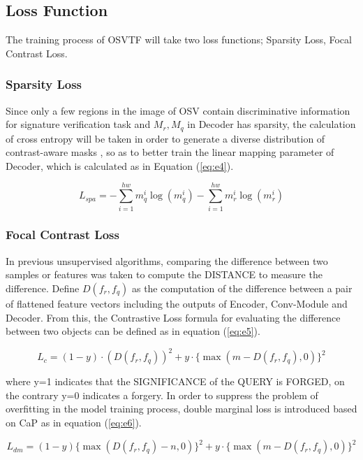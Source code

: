 \documentclass{article}
\begin{document}
\subsection{Loss Function}

The training process of OSVTF will take two loss functions; Sparsity Loss, Focal Contrast Loss.

\subsubsection*{Sparsity Loss}
Since only a few regions in the image of OSV contain discriminative information for signature verification task and $M_r,M_q$ in Decoder has sparsity, the calculation of cross entropy will be taken in order to generate a diverse distribution of contrast-aware masks \cite{16}, so as to better train the linear mapping parameter of Decoder, which is calculated as in Equation (\ref{eq:e4}).

\begin{equation}\label{eq:e4}
	L_{spa}=-\sum_{i=1}^{hw} m_q^i \log(m_q^i ) - \sum_{i=1}^{hw} m_r^i \log(m_r^i)
\end{equation}


\subsubsection*{Focal Contrast Loss}

In previous unsupervised algorithms, comparing the difference between two samples or features was taken to compute the DISTANCE to measure the difference. Define $D(f_r, f_q)$ as the computation of the difference between a pair of flattened feature vectors including the outputs of Encoder, Conv-Module and Decoder. From this, the Contrastive Loss \cite{18} formula for evaluating the difference between two objects can be defined as in equation (\ref{eq:e5}).

\begin{equation}\label{eq:e5}
	L_c = (1 - y) \cdot (D(f_r, f_q))^2 + y \cdot \{\max(m-D(f_r, f_q), 0)\}^2
\end{equation}

where y=1 indicates that the SIGNIFICANCE of the QUERY is FORGED, on the contrary y=0 indicates a forgery. In order to suppress the problem of overfitting in the model training process, double marginal loss is introduced based on CaP \cite{19} as in equation (\ref{eq:e6}).

\begin{equation}\label{eq:e6}
	L_{dm}=(1 - y)\{\max(D(f_r, f_q) - n, 0) \}^2 + y \cdot \{\max(m - D(f_r, f_q), 0)\}^2
\end{equation}
\end{document}
